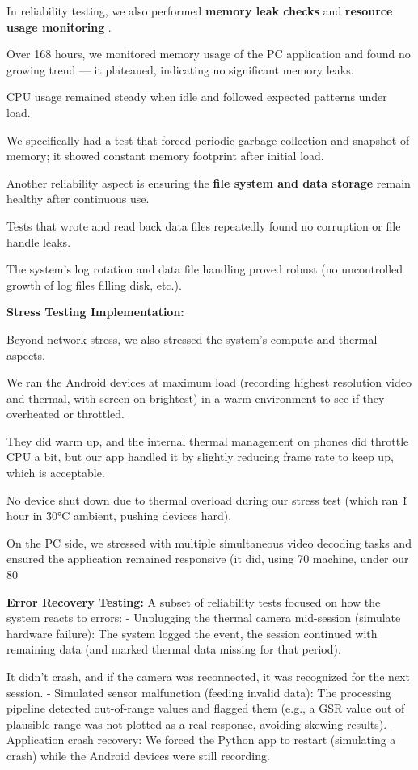 {{{In reliability testing, we also performed \textbf{memory leak checks}
 and \textbf{resource usage monitoring}
.

Over 168 hours, we monitored memory usage of the PC application and found no growing
trend --- it plateaued, indicating no significant memory leaks.

CPU usage remained steady when idle and followed expected patterns under load.

We specifically had a test that forced periodic garbage collection and snapshot of
memory; it showed constant memory footprint after initial load.

Another reliability aspect is ensuring the \textbf{file system and data storage}
 remain healthy after continuous use.

Tests that wrote and read back data files repeatedly found no corruption or file
handle leaks.

The system's log rotation and data file handling proved robust (no uncontrolled
growth of log files filling disk, etc.).

\textbf{Stress Testing Implementation:}

Beyond network stress, we also stressed the system's compute and thermal aspects.

We ran the Android devices at maximum load (recording highest resolution video and
thermal, with screen on brightest) in a warm environment to see if they overheated or
throttled.

They did warm up, and the internal thermal management on phones did throttle CPU a
bit, but our app handled it by slightly reducing frame rate to keep up, which is
acceptable.

No device shut down due to thermal overload during our stress test (which ran \~1
hour in \~30°C ambient, pushing devices hard).

On the PC side, we stressed with multiple simultaneous video decoding tasks and
ensured the application remained responsive (it did, using \~70%
machine, under our 80%

\textbf{Error Recovery Testing:}
 A subset of reliability tests focused on how the system reacts to errors: -
 Unplugging the thermal camera mid-session (simulate hardware failure): The system
 logged the event, the session continued with remaining data (and marked thermal data
 missing for that period).

It didn't crash, and if the camera was reconnected, it was recognized for the next
session.  - Simulated sensor malfunction (feeding invalid data): The processing
pipeline detected out-of-range values and flagged them (e.g., a GSR value out of
plausible range was not plotted as a real response, avoiding skewing results).  -
Application crash recovery: We forced the Python app to restart (simulating a crash)
while the Android devices were still recording.

}}}

